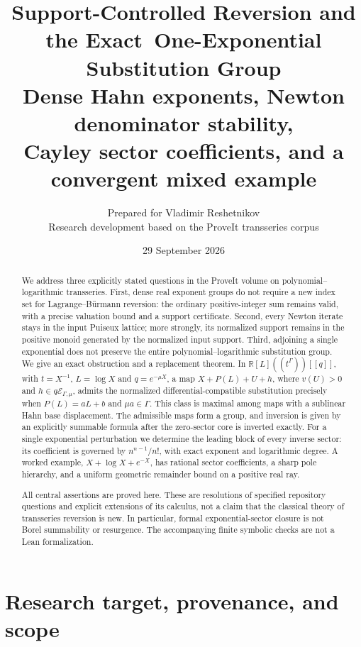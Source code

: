\documentclass[11pt,a4paper]{article}
\title{\textbf{Support-Controlled Reversion and the Exact\ One-Exponential Substitution Group}\\[0.65em]
\large Dense Hahn exponents, Newton denominator stability,\\
Cayley sector coefficients, and a convergent mixed example}
\author{Prepared for Vladimir Reshetnikov\\\small Research development based on the ProveIt transseries corpus}
\date{29 September 2026}
\theoremstyle{definition}
\theoremstyle{remark}
\newcommand{\R}{\mathbb R}
\newcommand{\E}{\mathcal E_{\Gamma,\mu}}
\begin{document}
\maketitle
\begin{abstract}
We address three explicitly stated questions in the ProveIt volume on
polynomial--logarithmic transseries. First, dense real exponent groups do not
require a new index set for Lagrange--B\"urmann reversion: the ordinary
positive-integer sum remains valid, with a precise valuation bound and a
support certificate. Second, every Newton iterate stays in the input
Puiseux lattice; more strongly, its normalized support remains in the positive
monoid generated by the normalized input support. Third, adjoining a single
exponential does not preserve the entire polynomial--logarithmic substitution
group. We give an exact obstruction and a replacement theorem. In
$\R[L]((t^\Gamma))[[q]]$, with $t=X^{-1}$, $L=\log X$ and
$q=e^{-\mu X}$, a map $X+P(L)+U+h$, where $v(U)>0$ and $h\in q\E$, admits the
normalized differential-compatible substitution precisely when
$P(L)=aL+b$ and $\mu a\in\Gamma$. This class is maximal among maps with a sublinear Hahn base displacement.
The admissible maps form a group, and inversion is given by an explicitly summable formula after the zero-sector
core is inverted exactly. For a single exponential perturbation we determine
the leading block of every inverse sector: its coefficient is governed by
$n^{n-1}/n!$, with exact exponent and logarithmic degree. A worked example,
$X+\log X+e^{-X}$, has rational sector coefficients, a sharp pole hierarchy,
and a uniform geometric remainder bound on a positive real ray.

All central assertions are proved here. These are resolutions of specified
repository questions and explicit extensions of its calculus, not a claim
that the classical theory of transseries reversion is new. In particular,
formal exponential-sector closure is not Borel summability or resurgence.
The accompanying finite symbolic checks are not a Lean formalization.
\end{abstract}
\newpage
\tableofcontents
\newpage

\section{Research target, provenance, and scope}
\label{sec:scope}
\end{document}
